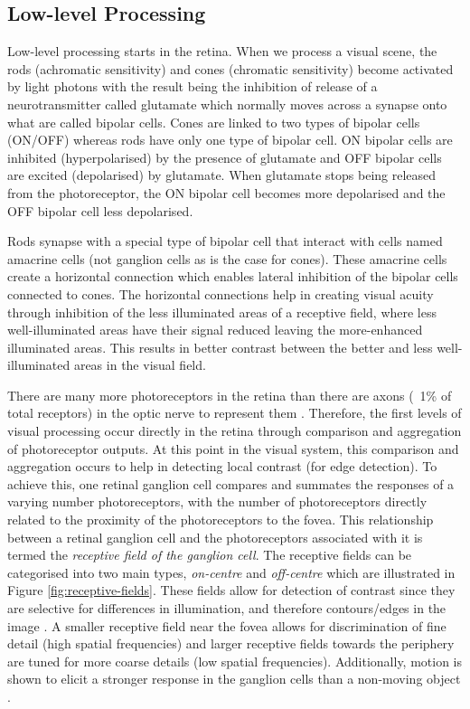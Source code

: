 \subsection{Low-level Processing}
Low-level processing starts in the retina. 
When we process a visual scene, the rods (achromatic sensitivity) and cones (chromatic sensitivity) become activated by light photons with the result being the inhibition of release of a neurotransmitter called glutamate which normally moves across a synapse onto what are called bipolar cells. 
Cones are linked to two types of bipolar cells (ON/OFF) whereas rods have only one type of bipolar cell. 
ON bipolar cells are inhibited (hyperpolarised) by the presence of glutamate and OFF bipolar cells are excited (depolarised) by glutamate. 
When glutamate stops being released from the photoreceptor, the ON bipolar cell becomes more depolarised and the OFF bipolar cell less depolarised. 

Rods synapse with a special type of bipolar cell that interact with cells named amacrine cells (not ganglion cells as is the case for cones). 
These amacrine cells create a horizontal connection which enables lateral inhibition of the bipolar cells connected to cones. 
The horizontal connections help in creating visual acuity through inhibition of the less illuminated areas of a receptive field, where 
less well-illuminated areas have their signal reduced leaving the more-enhanced illuminated areas. 
This results in better contrast between the better and less well-illuminated areas in the visual field. 

There are many more photoreceptors in the retina than there are axons (~1\% of total receptors) in the optic nerve to represent them \cite{kandel2012principles}. 
Therefore, the first levels of visual processing occur directly in the retina through comparison and aggregation of photoreceptor outputs. 
At this point in the visual system, this comparison and aggregation occurs to help in detecting local contrast (for edge detection). 
To achieve this, one retinal ganglion cell compares and summates the responses of a varying number photoreceptors, with the number of photoreceptors directly related to the proximity of the photoreceptors to the fovea. 
This relationship between a retinal ganglion cell and the photoreceptors associated with it is termed the \emph{receptive field of the ganglion cell}. 
The receptive fields can be categorised into two main types, \emph{on-centre} and \emph{off-centre} which are illustrated in Figure \ref{fig:receptive-fields}. 
These fields allow for detection of contrast since they are selective for differences in illumination, and therefore contours/edges in the image \cite{kandel2012principles}. 
A smaller receptive field near the fovea allows for discrimination of fine detail (high spatial frequencies) and larger receptive fields towards the periphery are tuned for more coarse details (low spatial frequencies). 
Additionally, motion is shown to elicit a stronger response in the ganglion cells than a non-moving object \cite{kandel2012principles}. 

